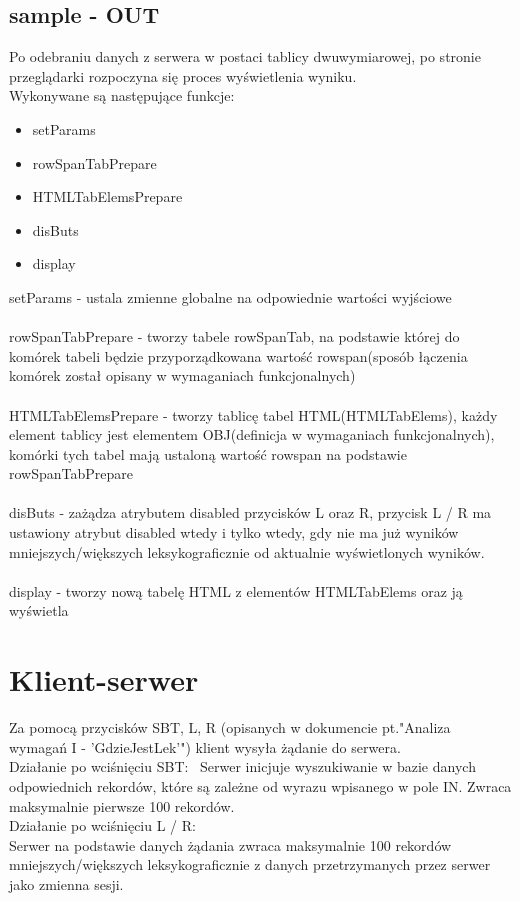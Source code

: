 \documentclass[10pt, a4paper]{article}
\begin{document}
\subsection{sample - OUT}
Po odebraniu danych z serwera w postaci tablicy dwuwymiarowej, po stronie przeglądarki rozpoczyna się proces wyświetlenia wyniku.\\
Wykonywane są następujące funkcje:
\begin{itemize}
\item setParams
\item rowSpanTabPrepare
\item HTMLTabElemsPrepare
\item disButs
\item display
\end{itemize}
setParams - ustala zmienne globalne na odpowiednie wartości wyjściowe \\ \\
rowSpanTabPrepare - tworzy tabele rowSpanTab, na podstawie której do komórek tabeli będzie przyporządkowana wartość rowspan(sposób łączenia komórek został opisany w wymaganiach funkcjonalnych) \\ \\
HTMLTabElemsPrepare - tworzy tablicę tabel HTML(HTMLTabElems), każdy element tablicy jest elementem OBJ(definicja w wymaganiach funkcjonalnych), komórki tych tabel mają ustaloną wartość rowspan na podstawie rowSpanTabPrepare \\ \\
disButs - zażądza atrybutem disabled przycisków L oraz R,
przycisk L / R ma ustawiony atrybut disabled wtedy i tylko wtedy, gdy nie ma już wyników mniejszych/większych leksykograficznie od aktualnie wyświetlonych wyników. \\ \\
display - tworzy nową tabelę HTML z elementów HTMLTabElems oraz ją wyświetla \\
\section{Klient-serwer}
Za pomocą przycisków SBT, L, R (opisanych w dokumencie pt."Analiza wymagań I - 'GdzieJestLek'") klient wysyła żądanie do serwera.\\
Działanie po wciśnięciu SBT: \
Serwer inicjuje wyszukiwanie w bazie danych odpowiednich rekordów, które są zależne od wyrazu wpisanego w pole IN.
Zwraca maksymalnie pierwsze 100 rekordów.\\
Działanie po wciśnięciu L / R: \\
Serwer na podstawie danych żądania zwraca maksymalnie 100 rekordów mniejszych/większych leksykograficznie z danych przetrzymanych przez serwer jako zmienna sesji.
\end{document}
